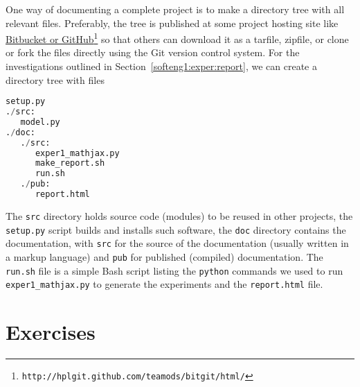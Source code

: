 \documentclass[graybox,sectrefs,envcountresetchap,open=right,final]{svmonodo}
\begin{document}
One way of documenting a complete project is to make a directory tree
with all relevant files. Preferably, the tree is published at some
project hosting site like \href{{http://hplgit.github.com/teamods/bitgit/html/}}{Bitbucket or GitHub}\footnote{\texttt{http://hplgit.github.com/teamods/bitgit/html/}} so that others can
download it as a tarfile, zipfile, or clone or fork the files directly
using the Git version control system.  For the investigations outlined
in Section~\ref{softeng1:exper:report}, we can create a directory tree
with files












\begin{lstlisting}[language=Python,style=gray]
setup.py
./src:
   model.py
./doc:
   ./src:
      exper1_mathjax.py
      make_report.sh
      run.sh
   ./pub:
      report.html

\end{lstlisting}

The \texttt{src} directory holds source code (modules) to be reused in other projects,
the \texttt{setup.py} script builds and installs such software,
the \texttt{doc} directory contains the documentation, with \texttt{src} for the
source of the documentation (usually written in a markup language)
and \texttt{pub} for published (compiled) documentation.
The \texttt{run.sh} file is a simple Bash script listing the \texttt{python} commands
we used to run \Verb!exper1_mathjax.py! to generate the experiments and
the \texttt{report.html} file.


\section{Exercises}
\end{document}

